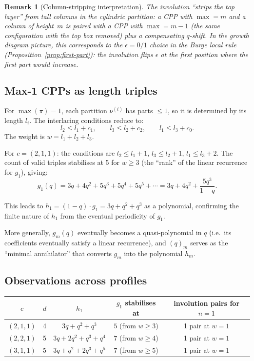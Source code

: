 \documentclass[11pt]{article}
\newtheorem{remark}[theorem]{Remark}
\begin{document}
\begin{remark}[Column-stripping interpretation]
The involution ``strips the top layer'' from tall columns in the cylindric
partition: a CPP with $\max = m$ and a column of height~$m$ is paired with a
CPP with $\max = m - 1$ (the same configuration with the top box removed) plus a
compensating $q$-shift. In the growth diagram picture, this corresponds to the
$\epsilon = 0/1$ choice in the Burge local rule
(Proposition~\ref{prop:first-part}): the involution flips $\epsilon$
at the first position where the first part would increase.
\end{remark}

\subsection{Max-1 CPPs as length triples}

For $\max(\pi) = 1$, each partition $\nu^{(i)}$ has parts $\leq 1$, so it is
determined by its length $l_i$. The interlacing conditions reduce to:
\begin{equation}
  l_2 \leq l_1 + c_1, \qquad l_3 \leq l_2 + c_2, \qquad l_1 \leq l_3 + c_0.
  \label{eq:length-conditions}
\end{equation}
The weight is $w = l_1 + l_2 + l_3$.

For $c = (2,1,1)$: the conditions are $l_2 \leq l_1 + 1$, $l_3 \leq l_2 + 1$,
$l_1 \leq l_3 + 2$. The count of valid triples stabilises at 5 for $w \geq 3$
(the ``rank'' of the linear recurrence for $g_1$), giving:
\[
  g_1(q) = 3q + 4q^2 + 5q^3 + 5q^4 + 5q^5 + \cdots = 3q + 4q^2 + \frac{5q^3}{1-q}.
\]

This leads to $h_1 = (1-q) \cdot g_1 = 3q + q^2 + q^3$ as a polynomial,
confirming the finite nature of $h_1$ from the eventual periodicity of $g_1$.

More generally, $g_m(q)$ eventually becomes a quasi-polynomial in $q$ (i.e.\
its coefficients eventually satisfy a linear recurrence), and $(q)_m$ serves as
the ``minimal annihilator'' that converts $g_m$ into the polynomial $h_m$.

\subsection{Observations across profiles}

\begin{center}
\begin{tabular}{c|c|c|c|c}
$c$ & $d$ & $h_1$ & $g_1$ stabilises at & involution pairs for $n=1$ \\
\hline
$(2,1,1)$ & 4 & $3q + q^2 + q^3$ & $5$ (from $w \geq 3$) & 1 pair at $w=1$ \\
$(2,2,1)$ & 5 & $3q + 2q^2 + q^3 + q^4$ & $7$ (from $w \geq 4$) & 1 pair at $w=1$ \\
$(3,1,1)$ & 5 & $3q + q^2 + 2q^3 + q^5$ & $7$ (from $w \geq 5$) & 1 pair at $w=1$ \\
\end{tabular}
\end{center}
\end{document}

